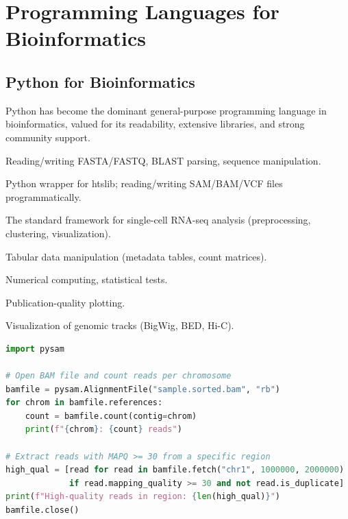 \section{Programming Languages for Bioinformatics}
\label{sec:bioinf:programming}

\subsection{Python for Bioinformatics}
\label{subsec:bioinf:python}

Python has become the dominant general-purpose programming language in bioinformatics, valued for its readability, extensive libraries, and strong community support.

\begin{description}[style=nextline, font=\bfseries, itemsep=3pt]
  \item[Biopython] Reading/writing FASTA/FASTQ, BLAST parsing, sequence manipulation.
  \item[pysam] Python wrapper for htslib; reading/writing SAM/BAM/VCF files programmatically.
  \item[Scanpy] The standard framework for single-cell RNA-seq analysis (preprocessing, clustering, visualization).
  \item[pandas] Tabular data manipulation (metadata tables, count matrices).
  \item[NumPy / SciPy] Numerical computing, statistical tests.
  \item[matplotlib / seaborn] Publication-quality plotting.
  \item[pyGenomeTracks] Visualization of genomic tracks (BigWig, BED, Hi-C).
\end{description}

\begin{lstlisting}[language=Python,caption={Python example: reading a BAM file with pysam.},label=lst:pysam]
import pysam

# Open BAM file and count reads per chromosome
bamfile = pysam.AlignmentFile("sample.sorted.bam", "rb")
for chrom in bamfile.references:
    count = bamfile.count(contig=chrom)
    print(f"{chrom}: {count} reads")

# Extract reads with MAPQ >= 30 from a specific region
high_qual = [read for read in bamfile.fetch("chr1", 1000000, 2000000)
             if read.mapping_quality >= 30 and not read.is_duplicate]
print(f"High-quality reads in region: {len(high_qual)}")
bamfile.close()
\end{lstlisting}

